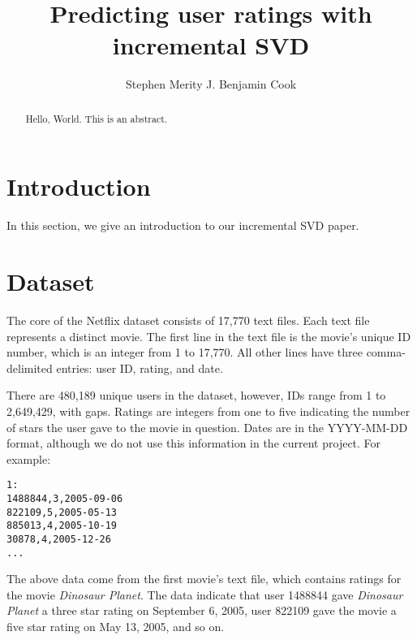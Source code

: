 \documentclass{article} %
\title{Predicting user ratings with incremental SVD}
\author{
Stephen Merity
\And
J. Benjamin Cook
}
\begin{document}
\maketitle

\begin{abstract}
Hello, World. This is an abstract.
\end{abstract}

\section{Introduction}

In this section, we give an introduction to our incremental SVD paper.

\section{Dataset}

The core of the Netflix dataset consists of 17,770 text files.
Each text file represents a distinct movie.
The first line in the text file is the movie's unique ID number, which is
an integer from 1 to 17,770.
All other lines have three comma-delimited entries: user ID, rating, and date.

There are 480,189 unique users in the dataset, however, IDs range from 1 to 2,649,429, with gaps. 
Ratings are integers from one to five indicating the number of stars 
the user gave to the movie in question.
Dates are in the YYYY-MM-DD format, although we do not use this information in the current project. 
For example:

\begin{verbatim}
1:
1488844,3,2005-09-06
822109,5,2005-05-13
885013,4,2005-10-19
30878,4,2005-12-26
...
\end{verbatim}

The above data come from the first movie's text file, which contains ratings for the movie \emph{Dinosaur Planet}. The data indicate that user 1488844 gave \emph{Dinosaur Planet} a three star rating on September 6, 2005, user 822109 gave the movie a five star rating on May 13, 2005, and so on.
\end{document}
